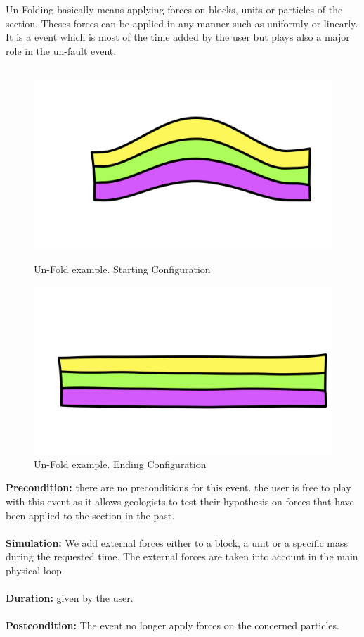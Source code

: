 \documentclass[12pt, a4paper]{report} %
\begin{document}
Un-Folding basically means applying forces on blocks, units or particles of the section. Theses forces can be applied in any manner such as uniformly or linearly. It is a event which is most of the time added by the user but plays also a major role in the un-fault event.\\\\
\begin{figure}[h]
    \begin{minipage}[c]{.46\linewidth}
        \centering
        \includegraphics[scale=0.2]{unFoldDescription0.png}
	\caption{Un-Fold example. Starting Configuration}
    \end{minipage}
    \hfill%
    \begin{minipage}[c]{.46\linewidth}
        \centering
        \includegraphics[scale=0.2]{unFoldDescription1.png}
	\caption{Un-Fold example. Ending Configuration}
    \end{minipage}
\end{figure}
\textbf{Precondition:} there are no preconditions for this event. the user is free to play with this event as it allows geologists to test their hypothesis on forces that have been applied to the section in the past.\\\\
\textbf{Simulation:} We add external forces either to a block, a unit or a specific mass during the requested time. The external forces are taken into account in the main physical loop.\\\\
\textbf{Duration:} given by the user.\\\\
\textbf{Postcondition:} The event no longer apply forces on the concerned particles.\\\\
\end{document}
